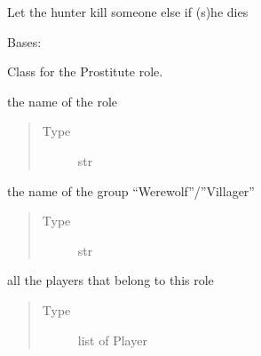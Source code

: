 \documentclass[letterpaper,10pt,english]{sphinxmanual}
\begin{document}
\begin{fulllineitems}
\begin{fulllineitems}
\begin{quote}
\begin{description}
\end{description}\end{quote}

\end{fulllineitems}



\begin{fulllineitems}
Let the hunter kill someone else if (s)he dies

\end{fulllineitems}


\end{fulllineitems}



\begin{fulllineitems}
Bases: 

Class for the Prostitute role.


\begin{fulllineitems}
the name of the role
\begin{quote}\begin{description}
\item[{Type}] \leavevmode
str

\end{description}\end{quote}

\end{fulllineitems}



\begin{fulllineitems}
the name of the group “Werewolf”/”Villager”
\begin{quote}\begin{description}
\item[{Type}] \leavevmode
str

\end{description}\end{quote}

\end{fulllineitems}



\begin{fulllineitems}
all the players that belong to this role
\begin{quote}\begin{description}
\item[{Type}] \leavevmode
list of Player


\end{description}
\end{quote}
\end{fulllineitems}
\end{fulllineitems}
\end{document}
